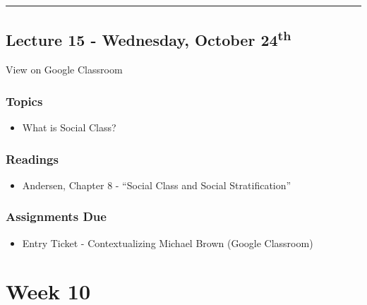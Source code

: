 \documentclass[]{book}
\providecommand{\tightlist}{%
  \setlength{\itemsep}{0pt}\setlength{\parskip}{0pt}}
\theoremstyle{definition}
\theoremstyle{definition}
\theoremstyle{definition}
\theoremstyle{remark}
\begin{document}
\begin{center}\rule{0.5\linewidth}{\linethickness}\end{center}

\hypertarget{lecture-15---wednesday-october-24th}{%
\subsection*{\texorpdfstring{Lecture 15 - Wednesday, October
24\textsuperscript{th}}{Lecture 15 - Wednesday, October 24th}}\label{lecture-15---wednesday-october-24th}}

View on Google Classroom

\hypertarget{topics-17}{%
\subsubsection*{Topics}\label{topics-17}}

\begin{itemize}
\tightlist
\item
  What is Social Class?
\end{itemize}

\hypertarget{readings-16}{%
\subsubsection*{Readings}\label{readings-16}}

\begin{itemize}
\tightlist
\item
  Andersen, Chapter 8 - ``Social Class and Social Stratification''
\end{itemize}

\hypertarget{assignments-due-3}{%
\subsubsection*{Assignments Due}\label{assignments-due-3}}

\begin{itemize}
\tightlist
\item
  Entry Ticket - Contextualizing Michael Brown (Google Classroom)
\end{itemize}

\hypertarget{week-10}{%
\section*{Week 10}\label{week-10}}
\end{document}
